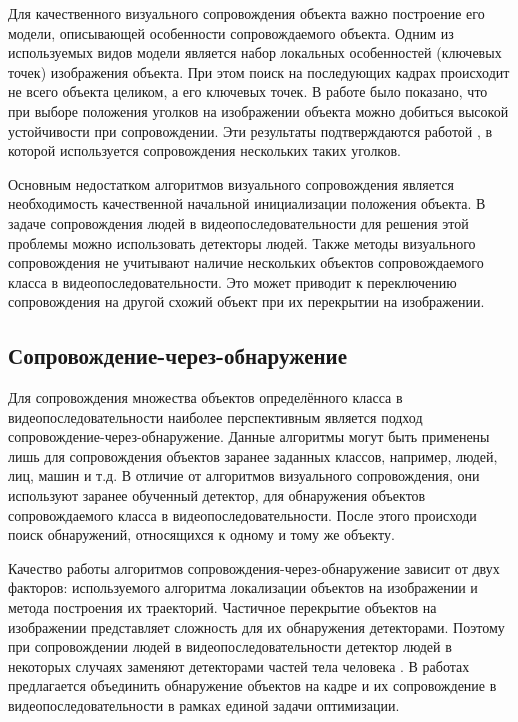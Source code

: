 Для качественного визуального сопровождения объекта важно построение его модели, описывающей особенности сопровождаемого объекта. Одним из используемых видов модели является набор локальных особенностей (ключевых точек) изображения объекта. При этом поиск на последующих кадрах происходит не всего объекта целиком, а его ключевых точек. В работе \cite{shi1994good} было показано, что при выборе положения уголков на изображении объекта можно добиться высокой устойчивости при сопровождении. Эти результаты подтверждаются работой \cite{kolsch2004fast}, в которой используется сопровождения нескольких таких уголков.

Основным недостатком алгоритмов визуального сопровождения является необходимость качественной начальной инициализации положения объекта. В задаче сопровождения людей в видеопоследовательности для решения этой проблемы можно использовать детекторы людей. Также методы визуального сопровождения не учитывают наличие нескольких объектов сопровождаемого класса в видеопоследовательности. Это может приводит к переключению сопровождения на другой схожий объект при их перекрытии на изображении.

\subsection{Сопровождение-через-обнаружение}

Для сопровождения множества объектов определённого класса в видеопоследовательности наиболее перспективным является подход сопровождение-через-обнаружение. Данные алгоритмы могут быть применены лишь для сопровождения объектов заранее заданных классов, например, людей, лиц, машин и т.д. В отличие от алгоритмов визуального сопровождения, они используют заранее обученный детектор, для обнаружения объектов сопровождаемого класса в видеопоследовательности. После этого происходи поиск обнаружений, относящихся к одному и тому же объекту.

Качество работы алгоритмов сопровождения-через-обнаружение зависит от двух факторов: используемого алгоритма локализации объектов на изображении и метода построения их траекторий. Частичное перекрытие объектов на изображении представляет сложность для их обнаружения детекторами. Поэтому при сопровождении людей в видеопоследовательности детектор людей в некоторых случаях заменяют детекторами частей тела человека \cite{izadinia20122t}. В работах \cite{wu2012coupling,yan2012track} предлагается объединить обнаружение объектов на кадре и их сопровождение в видеопоследовательности в рамках единой задачи оптимизации.


